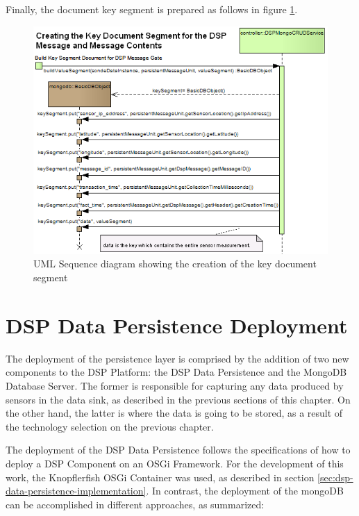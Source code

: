 Finally, the document key segment is prepared as follows in figure
\ref{fig:From-Creating-Key-Segment-Sequence}.

\begin{figure}[!b]
  \centering
  \includegraphics[scale=0.5]{../diagrams/From-Creating-Key-Segment-Sequence}
  \caption{UML Sequence diagram showing the creation of the key document segment}
  \label{fig:From-Creating-Key-Segment-Sequence}
\end{figure}

\section{DSP Data Persistence Deployment}

The deployment of the persistence layer is comprised by the addition of two
new components to the DSP Platform: the DSP Data Persistence and the MongoDB
Database Server. The former is responsible for capturing any data
produced by sensors in the data sink, as described in the previous sections of
this chapter. On the other hand, the latter is where the data is going to be
stored, as a result of the technology selection on the previous chapter. 

The deployment of the DSP Data Persistence follows the specifications of how to
deploy a DSP Component on an OSGi Framework. For the development of this work,
the Knopflerfish OSGi Container was used, as described in section
\ref{sec:dsp-data-persistence-implementation}. In contrast, the
deployment of the mongoDB can be accomplished in different approaches, as
summarized: 

